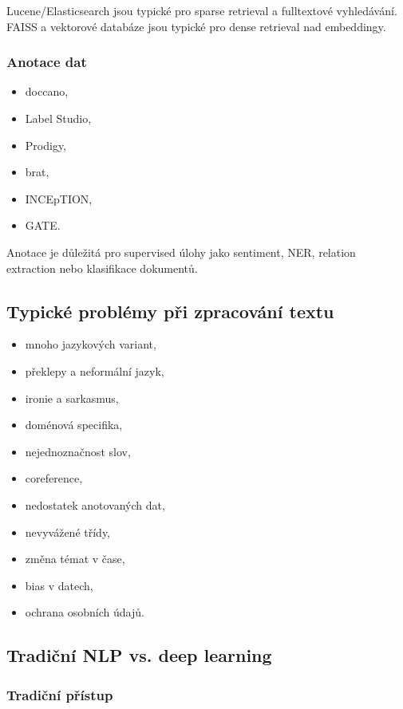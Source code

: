 Lucene/Elasticsearch jsou typické pro sparse retrieval a fulltextové vyhledávání. FAISS a vektorové
databáze jsou typické pro dense retrieval nad embeddingy.

\subsubsection{Anotace dat}

\begin{itemize}
    \item doccano,
    \item Label Studio,
    \item Prodigy,
    \item brat,
    \item INCEpTION,
    \item GATE.
\end{itemize}

Anotace je důležitá pro supervised úlohy jako sentiment, NER, relation extraction nebo klasifikace dokumentů.

\subsection{Typické problémy při zpracování textu}

\begin{itemize}
    \item mnoho jazykových variant,
    \item překlepy a neformální jazyk,
    \item ironie a sarkasmus,
    \item doménová specifika,
    \item nejednoznačnost slov,
    \item coreference,
    \item nedostatek anotovaných dat,
    \item nevyvážené třídy,
    \item změna témat v čase,
    \item bias v datech,
    \item ochrana osobních údajů.
\end{itemize}

\subsection{Tradiční NLP vs. deep learning}

\subsubsection{Tradiční přístup}

